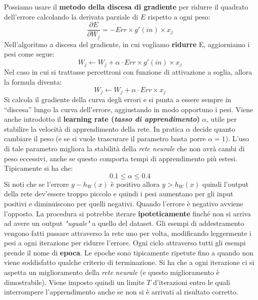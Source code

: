 Possiamo usare il \textbf{metodo della discesa di gradiente} per ridurre il quadrato dell'errore calcolando la derivata parziale di $E$ rispetto a ogni peso: 
\[\frac{\partial E}{\partial W_j} = - Err \times g'(in) \times x_j\] 
Nell'algoritmo a discesa del gradiente, in cui vogliamo \textbf{ridurre} E, aggiorniamo i pesi come segue:
\[W_{j}\gets W_{j}+\alpha\cdot Err \times g'(in) \times x_j\]
Nel caso in cui si trattasse percettroni con funzione di attivazione a soglia, allora la formula diventa:
\[W_{j}\gets W_{j}+\alpha\cdot Err \times x_j\]
Si calcola il gradiente della curva degli errori e si punta a essere sempre in ``discesa'' lungo la curva dell'errore, aggiustando in modo opportuno i pesi. Viene anche introdotto il \textbf{learning rate (\textit{tasso di apprendimento})} $\alpha$, utile per stabilire la velocità di apprendimento della rete. In pratica $\alpha$ decide quanto cambiare il peso (e se si vuole trascurare il parametro basta porre $\alpha =1$). L'uso di tale parametro migliora la stabilità della \textit{rete neurale} che non avrà cambi di peso eccessivi, anche se
questo comporta tempi di apprendimento più estesi. Tipicamente si ha che:
\[0.1\leq\alpha\leq 0.4\]
Si noti che se l'errore $y-h_W(x)$ è positivo allora $y>h_W(x)$ quindi l'output della rete dev'essere troppo piccolo e quindi i pesi aumentano per gli input positivi e diminuiscono per quelli negativi. Quando l'errore è negativo avviene l'opposto. La procedura si potrebbe iterare \textbf{ipoteticamente} finché non si arriva ad avere un output \textit{"uguale"} a quello del dataset. Gli esempi di addestramento vengono fatti passare attraverso la rete uno per volta, modificando leggermente i pesi a ogni iterazione per ridurre l'errore. Ogni ciclo attraverso tutti gli esempi prende il nome di \textbf{epoca}. Le epoche sono tipicamente ripetute fino a quando non viene soddisfatto qualche criterio di terminazione. Si ha che a ogni iterazione ci si aspetta un miglioramento della \textit{rete neurale} (e questo miglioramento è dimostrabile). Viene imposto
quindi un limite $T$ d'iterazioni entro le quali interrompere l'apprendimento anche se non si è arrivati al risultato
corretto.

